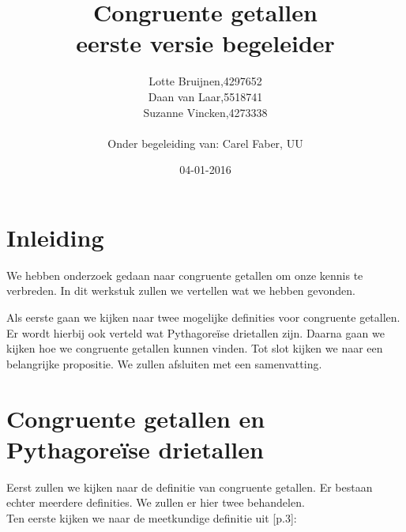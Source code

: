 \documentclass[12pt,reqno]{article}
\title{\textbf{Congruente getallen}\\
		\small{eerste versie begeleider}}
\author{
	\begin{tabular}{ l l }
		Lotte Bruijnen, & 4297652 \\
		Daan van Laar, & 5518741 \\
		Suzanne Vincken, & 4273338
	\end{tabular}\\
	Onder begeleiding van: Carel Faber, UU
}
\date{04-01-2016}
\newcommand*{\NN}{\ensuremath{\mathbb{N}}}
\theoremstyle{theorem}
\theoremstyle{definition}
\begin{document}
	
	\begin{titlepage}
		\maketitle
	\end{titlepage}

	\allowdisplaybreaks
	
	\section{Inleiding}
	We hebben onderzoek gedaan naar congruente getallen om onze kennis te verbreden. In dit werkstuk zullen we vertellen wat we hebben gevonden.
	
	Als eerste gaan we kijken naar twee mogelijke definities voor congruente getallen. Er wordt hierbij ook verteld wat Pythagore\"ise drietallen zijn. Daarna gaan we kijken hoe we congruente getallen kunnen vinden. Tot slot kijken we naar een belangrijke propositie. We zullen afsluiten met een samenvatting.
	
	
	
	
	\section{Congruente getallen en Pythagore\"{i}se drietallen}	
	Eerst zullen we kijken naar de definitie van congruente getallen. Er bestaan echter meerdere definities. We zullen er hier twee behandelen.\\
	
	Ten eerste kijken we naar de meetkundige definitie uit \cite{Oort}[p.3]:	
	
\end{document}
